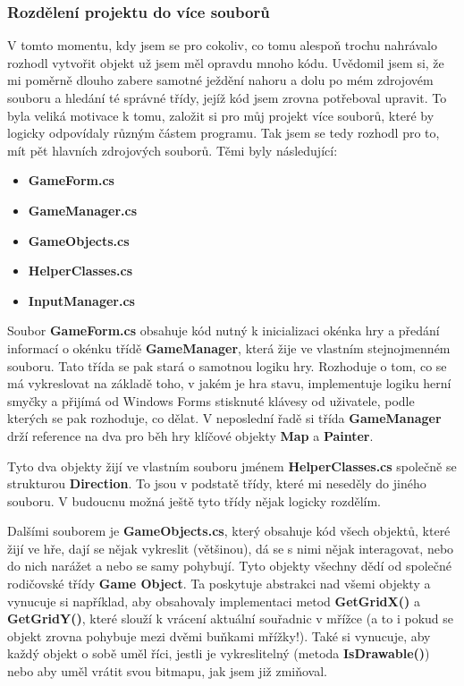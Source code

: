 \documentclass[a4]{article}
\begin{document}
\subsubsection{Rozdělení projektu do více souborů}
V tomto momentu, kdy jsem se pro cokoliv, co tomu alespoň trochu nahrávalo rozhodl vytvořit objekt už jsem měl opravdu mnoho kódu. Uvědomil jsem si, že mi poměrně dlouho zabere samotné ježdění nahoru a dolu po mém zdrojovém souboru a hledání té správné třídy, jejíž kód jsem zrovna potřeboval upravit. To byla veliká motivace k tomu, založit si pro můj projekt více souborů, které by logicky odpovídaly různým částem programu. Tak jsem se tedy rozhodl pro to, mít pět hlavních zdrojových souborů. Těmi byly následující:
\begin{itemize}
    \item \textbf{GameForm.cs}
    \item \textbf{GameManager.cs}
    \item \textbf{GameObjects.cs}
    \item \textbf{HelperClasses.cs}
    \item \textbf{InputManager.cs}
\end{itemize}
Soubor \textbf{GameForm.cs} obsahuje kód nutný k inicializaci okénka hry a předání informací o okénku třídě \textbf{GameManager}, která žije ve vlastním stejnojmenném souboru. Tato třída se pak stará o samotnou logiku hry. Rozhoduje o tom, co se má vykreslovat na základě toho, v jakém je hra stavu, implementuje logiku herní smyčky a přijímá od Windows Forms stisknuté klávesy od uživatele, podle kterých se pak rozhoduje, co dělat. V neposlední řadě si třída \textbf{GameManager} drží reference na dva pro běh hry klíčové objekty \textbf{Map} a \textbf{Painter}.

Tyto dva objekty žijí ve vlastním souboru jménem \textbf{HelperClasses.cs} společně se strukturou \textbf{Direction}. To jsou v podstatě třídy, které mi neseděly do jiného souboru. V budoucnu možná ještě tyto třídy nějak logicky rozdělím. 

Dalšími souborem je \textbf{GameObjects.cs}, který obsahuje kód všech objektů, které žijí ve hře, dají se nějak vykreslit (většinou), dá se s nimi nějak interagovat, nebo do nich narážet a nebo se samy pohybují. Tyto objekty všechny dědí od společné rodičovské třídy \textbf{Game Object}. Ta poskytuje abstrakci nad všemi objekty a vynucuje si například, aby obsahovaly implementaci metod \textbf{GetGridX()} a \textbf{GetGridY()}, které slouží k vrácení aktuální souřadnic v mřížce (a to i pokud se objekt zrovna pohybuje mezi dvěmi buňkami mřížky!). Také si vynucuje, aby každý objekt o sobě uměl říci, jestli je vykreslitelný (metoda \textbf{IsDrawable()}) nebo aby uměl vrátit svou bitmapu, jak jsem již zmiňoval.
\end{document}
